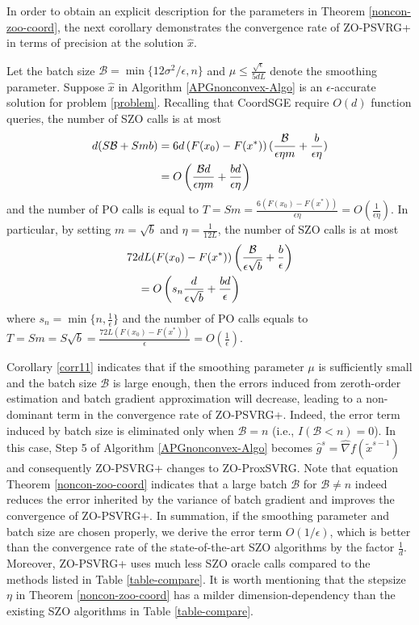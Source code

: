 In order to obtain an explicit description for the  parameters in Theorem \ref{noncon-zoo-coord}, the next corollary demonstrates the convergence rate of ZO-PSVRG+ in terms of precision at the solution $\hat{x}$.
 \begin{corollary}\label{corr11}
Let the batch size $\mathcal{B} = \min\{12\sigma^2/\epsilon, n\}$ and $\mu \leq \frac{\sqrt{\epsilon}}{5{dL}}$ denote the smoothing parameter. Suppose $\hat{x}$ in Algorithm \ref{APGnonconvex-Algo} is an $\epsilon$-accurate solution for problem \eqref{problem}. Recalling that CoordSGE require $O(d)$ function queries, the number of SZO calls is at most 
\begin{align}
d(S\mathcal{B}+Smb) &= 6d \left(F(x_0) - F({x}^*)\right) (\frac{\mathcal{B}}{\epsilon\eta m}+\frac{b}{\epsilon\eta})\notag\\
& = O\left(\frac{\mathcal{B}d}{\epsilon\eta m}+\frac{bd}{\epsilon\eta}\right)\label{SZO-call-nocon}
\end{align}
and the number of PO calls is equal to $T = Sm = \frac{6\left(F(x_0) - F({x}^*)\right)}{\epsilon\eta} = O\left(\frac{1}{\epsilon\eta}\right)$. In particular, by setting $m=\sqrt{b}$ and $\eta = \frac{1}{12L}$, the number of SZO calls is at most 
\begin{align}
72&d L (F(x_0)-F(x^*))\left(\frac{\mathcal{B}}{\epsilon\sqrt{b}}+\frac{b}{\epsilon}\right)\notag\\
& = O\left(s_n\frac{d}{\epsilon \sqrt{b}}+\frac{bd}{\epsilon}\right)\label{SZO-call-par-nocon}
\end{align}
where $s_n = \min\{n,\frac{1}{\epsilon}\}$ and the number of PO calls equals to $T = Sm = S\sqrt{b} = \frac{72 L \left(F(x_0) - F({x}^*)\right)}{\epsilon} = O\left(\frac{1}{\epsilon}\right)$. 
\end{corollary}
Corollary \ref{corr11} indicates that if the smoothing parameter $\mu$ is sufficiently small and the batch size $\mathcal{B}$ is large enough, then the errors induced from zeroth-order estimation and batch gradient approximation will decrease, leading to a non-dominant term in the convergence rate of ZO-PSVRG+. Indeed, the error term induced by batch size  is eliminated only when $\mathcal{B} = n$  (i.e., $I(\mathcal{B} < n) = 0$). 
In
this case, Step 5 of Algorithm \ref{APGnonconvex-Algo} becomes $\hat{g}^s = \hat{\nabla} f(\tilde{x}^{s-1})$ and consequently ZO-PSVRG+ changes to ZO-ProxSVRG. Note that equation Theorem \ref{noncon-zoo-coord} indicates that a large batch $\mathcal{B}$  for $\mathcal{B} \neq n$ indeed reduces the error inherited by the variance of batch gradient and improves the convergence of ZO-PSVRG+. In summation, if the smoothing parameter and batch size are chosen properly, we derive the error term $O(1/\epsilon)$, which is better than the convergence rate of the state-of-the-art SZO algorithms by the factor $\frac{1}{d}$. Moreover, ZO-PSVRG+ uses much less SZO oracle calls compared to the methods listed in Table \ref{table-compare}. It is worth mentioning that the stepsize $\eta$ in Theorem \ref{noncon-zoo-coord} has a milder dimension-dependency than the existing SZO algorithms in Table \ref{table-compare}. 
